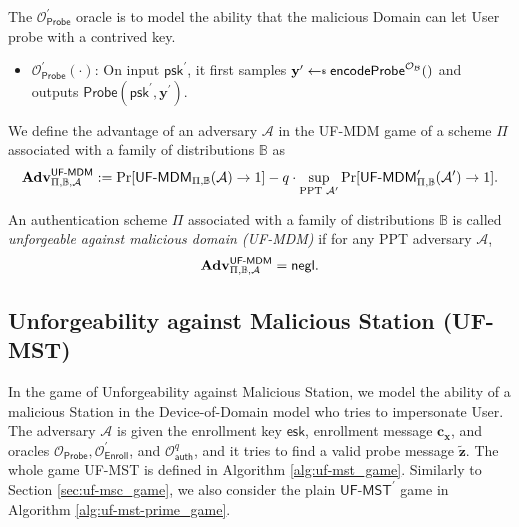 The $\mathcal{O}_\textsf{Probe}^\prime$ oracle is to model the ability that the malicious \textsf{Domain} can let \textsf{User} probe with a contrived key.

\begin{itemize}

	\item $\mathcal{O}_\textsf{Probe}^\prime (\cdot)$: On input $\textsf{psk}^\prime$, it first samples $\mathbf{y}^\prime \getsdollar \textsf{encodeProbe}^{\mathcal{O}_{\mathcal{B}}}()$ and outputs $\textsf{Probe}(\textsf{psk}^\prime, \mathbf{y}^\prime)$.

\end{itemize}

We define the advantage of an adversary $\mathcal{A}$ in the \textsf{UF-MDM} game of a scheme $\Pi$ associated with a family of distributions $\mathbb{B}$ as
\[
	\mathbf{Adv}^{\textsf{UF-MDM}}_{\Pi, \mathbb{B}, \mathcal{A}} := \Pr[{\textsf{UF-MDM}}_{\Pi, \mathbb{B}}(\mathcal{A}) \to 1] -
	q \cdot \sup_{\text{PPT } \mathcal{A}^\prime} \Pr[\textsf{UF-MDM}^\prime_{\Pi, \mathbb{B}}(\mathcal{A}^\prime) \to 1].
\]

An authentication scheme $\Pi$ associated with a family of distributions $\mathbb{B}$ is called \emph{unforgeable against malicious domain (UF-MDM)} if for any PPT adversary $\mathcal{A}$,
\[
	\mathbf{Adv}^{\textsf{UF-MDM}}_{\Pi, \mathbb{B}, \mathcal{A}} = \mathsf{negl}.
\]



\subsection{Unforgeability against Malicious Station (UF-MST)}
\label{sec:uf-mst_game}

In the game of Unforgeability against Malicious Station, we model the ability of a malicious \textsf{Station} in the Device-of-Domain model who tries to impersonate \textsf{User}.
The adversary $\mathcal{A}$ is given the enrollment key $\textsf{esk}$, enrollment message $\mathbf{c_x}$, and oracles $\mathcal{O}_\textsf{Probe}, \mathcal{O}_\textsf{Enroll}^\prime$, and $ \mathcal{O}_\textsf{auth}^q$, and it tries to find a valid probe message $\mathbf{\tilde{z}}$.
The whole game \textsf{UF-MST} is defined in Algorithm \ref{alg:uf-mst_game}. Similarly to Section \ref{sec:uf-msc_game}, we also consider the plain $\textsf{UF-MST}^\prime$ game in Algorithm \ref{alg:uf-mst-prime_game}.

